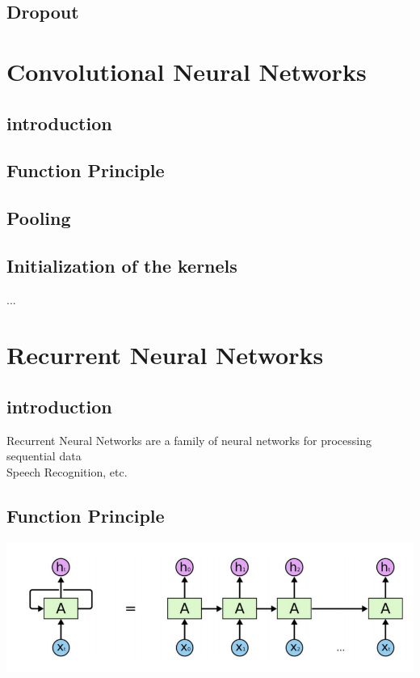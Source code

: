 \documentclass[a4paper,10pt,titlepage]{report}
\begin{document}
\subsection{Dropout}




\newpage
\section{Convolutional Neural Networks}
\subsection{introduction}
\subsection{Function Principle}
\subsection{Pooling}
\subsection{Initialization of the kernels}
...

\newpage
\section{Recurrent Neural Networks}
\subsection{introduction}
Recurrent Neural Networks are a family of neural networks for processing sequential data \\

Speech Recognition, etc.

\subsection{Function Principle}

\includegraphics[scale=0.1]{RNN_unrolled.png}
\end{document}
